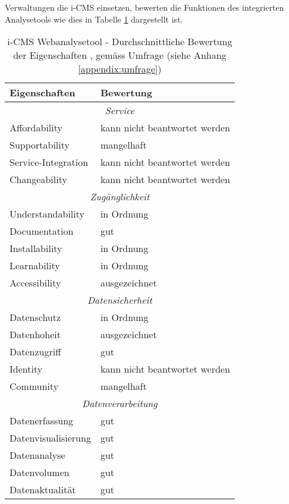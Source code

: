 \newpage

Verwaltungen die i-CMS einsetzen, bewerten die Funktionen des integrierten Analysetools wie dies in Tabelle \ref{tab: icmsfeaturebewertung} dargestellt ist. 

\begin{table}[h]
	\centering
	\begin{tabular}{ | p{4cm} | p{10cm} |}
		\hline
    \textbf{Eigenschaften} & \textbf{Bewertung}  \\
    \hline 
    \multicolumn{2}{|c|}{\textit{Service}}\\ \hline 
    Affordability  &  kann nicht beantwortet werden \\ \hline
    Supportability & mangelhaft \\ \hline
    Service-Integration & kann nicht beantwortet werden \\ \hline
    Changeability  & kann nicht beantwortet werden \\ \hline
    \multicolumn{2}{|c|}{\textit{Zugänglichkeit}}\\ \hline 
    Understandability   & in Ordnung \\ \hline
    Documentation  & gut \\ \hline
    Installability & in Ordnung \\ \hline
    Learnability  & in Ordnung \\ \hline
    Accessibility  & ausgezeichnet \\ \hline
    \multicolumn{2}{|c|}{\textit{Datensicherheit}}\\ \hline 
    Datenschutz  & in Ordnung \\ \hline
    Datenhoheit & ausgezeichnet \\ \hline
    Datenzugriff  & gut \\ \hline
    Identity  & kann nicht beantwortet werden \\  \hline
    Community  & mangelhaft \\ \hline
    \multicolumn{2}{|c|}{\textit{Datenverarbeitung}}\\ \hline 
    Datenerfassung  & gut \\  \hline
    Datenvisualisierung & gut \\ \hline
    Datenanalyse & gut \\ \hline
    Datenvolumen & gut \\ \hline
    Datenaktualität  & gut \\ \hline
	\end{tabular}
	\caption{i-CMS Webanalysetool - Durchschnittliche Bewertung der Eigenschaften \parencite{softwareProcurementEvaluationTable}, \parencite[S. 178]{nakatani2011toolselectionmethod} gemäss Umfrage (siehe Anhang \ref{appendix:umfrage})}
	\label{tab: icmsfeaturebewertung}
\end{table}

